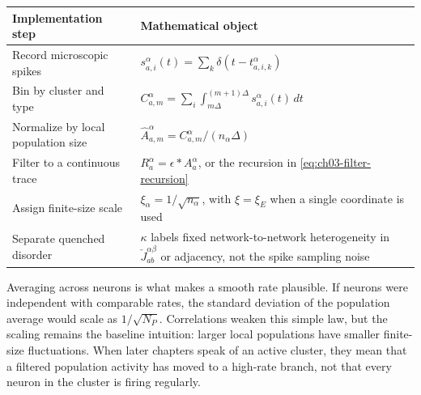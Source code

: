 \begin{center}
\renewcommand{\arraystretch}{1.35}
\begin{tabularx}{\textwidth}{@{}l X@{}}
  \toprule
  \textbf{Implementation step} & \textbf{Mathematical object} \\
  \midrule
  Record microscopic spikes &
  \(s_{a,i}^\alpha(t)=\sum_k\delta(t-t_{a,i,k}^\alpha)\) \\
  Bin by cluster and type &
  \(C_{a,m}^\alpha=\sum_i\int_{m\Delta}^{(m+1)\Delta}s_{a,i}^\alpha(t)\,dt\) \\
  Normalize by local population size &
  \(\widehat A_{a,m}^\alpha=C_{a,m}^\alpha/(n_\alpha\Delta)\) \\
  Filter to a continuous trace &
  \(R_a^\alpha=\epsilon*A_a^\alpha\), or the recursion in
  \eqref{eq:ch03-filter-recursion} \\
  Assign finite-size scale &
  \(\xi_\alpha=1/\sqrt{n_\alpha}\), with \(\xi=\xi_E\) when a single
  coordinate is used \\
  Separate quenched disorder &
  \(\kappa\) labels fixed network-to-network heterogeneity in
  \(\check J_{ab}^{\alpha\beta}\) or adjacency, not the spike sampling noise \\
  \bottomrule
\end{tabularx}
\end{center}

Averaging across neurons is what makes a smooth rate plausible. If neurons were
independent with comparable rates, the standard deviation of the population
average would scale as \(1/\sqrt{N_P}\). Correlations weaken this simple law,
but the scaling remains the baseline intuition: larger local populations have
smaller finite-size fluctuations. When later chapters speak of an active
cluster, they mean that a filtered population activity has moved to a high-rate
branch, not that every neuron in the cluster is firing regularly.

